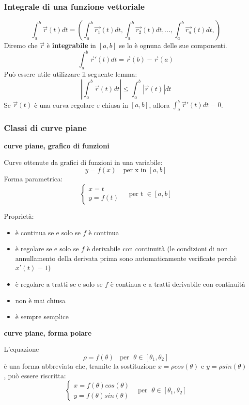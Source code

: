 \subsubsection{Integrale di una funzione vettoriale}
\[
    \int_{a}^{b} \vec{r}(t) dt =\left( \int_{a}^{b}\vec{r_1}(t) dt,\int_{a}^{b}\vec{r_2}(t) dt, \dots, \int_{a}^{b}\vec{r_n}(t) dt,\right)
\]
Diremo che $\vec{r}$ è \textbf{integrabile} in $[a,b]$ se lo è ognuna delle sue componenti.\newline
\[
    \int_{a}^{b} \vec{r}'(t) dt = \vec{r}(b) - \vec{r}(a)
\]
Può essere utile utilizzare il seguente lemma:
\[
    \left| \int_{a}^{b}\vec{r}(t)dt \right| \leq \int_{a}^{b}|\vec{r}(t)|dt
\]
Se $\vec{r}(t)$ è una curva regolare e chiusa in $[a,b]$, allora $\int_{a}^{b}\vec{r}'(t) dt =0$.\newline
\subsubsection{Classi di curve piane}
\textbf{curve piane, grafico di funzioni}
\begin{tcolorbox}
Curve ottenute da grafici di funzioni in una variabile:
\[
    y = f(x) \quad\text{per x in} \;[a,b]
\]
Forma parametrica:
\[
    \begin{cases}
        x=t \\
        y=f(t)
    \end{cases} \;\;\;\; \text{per t} \;\in[a,b]
\]
\end{tcolorbox}
Proprietà:
\begin{itemize}
    \item è continua se e solo se $f$ è continua
    \item è regolare se e solo se $f$ è derivabile con continuità (le condizioni di non annullamento della derivata prima sono automaticamente verificate perchè $x'(t) = 1$)
    \item è regolare a tratti se e solo se $f$ è continua e a tratti derivabile con continuità
    \item non è mai chiusa
    \item è sempre semplice
\end{itemize}
\textbf{curve piane, forma polare}\newline
\begin{tcolorbox}
L'equazione
\[
    \rho = f(\theta) \;\;\;\text{per } \; \theta \in [\theta_1, \theta_2]
\]
è una forma abbreviata che, tramite la sostituzione $x= \rho cos(\theta)$ e $y= \rho sin(\theta)$, può essere riscritta:
\[
    \begin{cases}
        x = f(\theta) cos(\theta)\\
        y = f(\theta) sin(\theta)
    \end{cases} \;\;\; \text{per } \; \theta \in [\theta_1, \theta_2]
\]
\end{tcolorbox}
